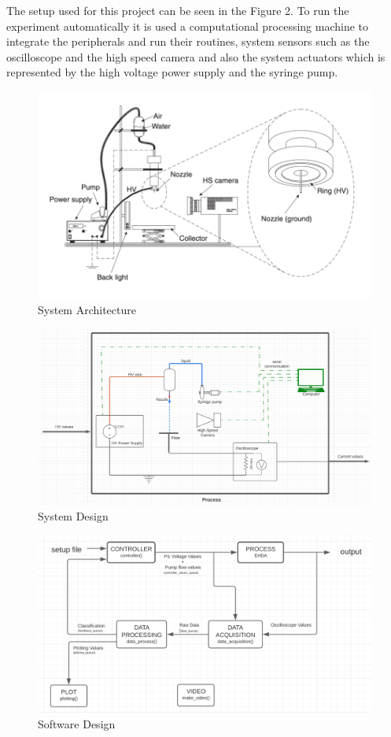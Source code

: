 The setup used for this project can be seen in the Figure 2. To run the experiment automatically it is used a computational processing machine to integrate the peripherals and run their routines, system sensors such as the oscilloscope and the high speed camera 
and also the system actuators which is represented by the high voltage power supply and the syringe pump. 

\begin{figure}[H]
    \center
    \includegraphics[width=12cm]{images/system_setup.png}
    \caption{System Architecture}
\end{figure}

\begin{figure}[H]
    \center
    \includegraphics[width=18cm]{images/system-design.png}
    \caption{System Design}
\end{figure}

\begin{figure}[H]
    \center
    \includegraphics[width=18cm]{images/software-design.png}
    \caption{Software Design}
\end{figure}

